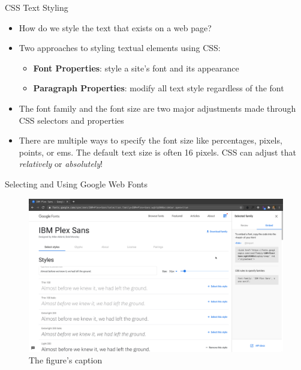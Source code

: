\documentclass[14pt,aspectratio=169]{beamer}
\begin{document}
%
\begin{frame}{CSS Text Styling}
  \begin{itemize}
    \item How do we style the text that exists on a web page?
      \vspace*{-.2in}
    \item Two approaches to styling textual elements using CSS:
      \begin{itemize}
        \item {\bf Font Properties}: style a site's font and its appearance
        \item {\bf Paragraph Properties}: modify all text style regardless of
          the font
      \end{itemize}
      \vspace*{-.2in}
    \item The font family and the font size are two major adjustments made
      through CSS selectors and properties
      \vspace*{-.2in}
    \item There are multiple ways to specify the font size like percentages,
      pixels, points, or ems. The default text size is often 16 pixels. CSS can
      adjust that {\em relatively} or {\em absolutely}!
  \end{itemize}
\end{frame}

%
\begin{frame}{Selecting and Using Google Web Fonts}
  \begin{figure}
    \centering
    \includegraphics[scale=.085]{images/google-web-fonts.png}
    \caption{The figure's caption}
  \end{figure}
\end{frame}
\end{document}
